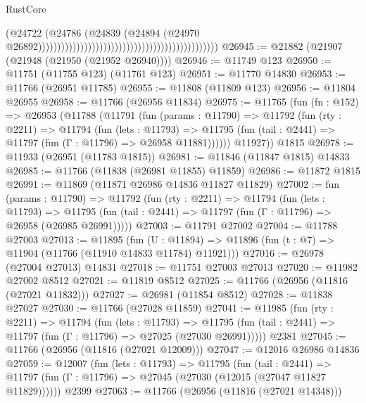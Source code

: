 \begin{lexlean}{RustCore}
\begin{coremodule}
                                                                                        (@24722
                                                                                          (@24786
                                                                                            (@24839
                                                                                              (@24894
                                                                                                (@24970
                                                                                                  @26892)))))))))))))))))))))))))))))))))))))))))))))))
@26945 := @21882 (@21907 (@21948 (@21950 (@21952 @26940))))
@26946 := @11749 @123
@26950 := @11751 (@11755 @123) (@11761 @123)
@26951 := @11770 @14830
@26953 := @11766 (@26951 @11785)
@26955 := @11808 (@11809 @123)
@26956 := @11804 @26955
@26958 := @11766 (@26956 @11834)
@26975 := @11765
    (fun (fn : @152) =>
    @26953
      (@11788
        (@11791
          (fun (params : @11790) =>
          @11792
            (fun (rty : @2211) =>
            @11794
              (fun (lets : @11793) =>
              @11795 (fun (tail : @2441) => @11797 (fun (Γ : @11796) => @26958 @11881))))))
        @11927))
    @1815
@26978 := @11933 (@26951 (@11783 @1815))
@26981 := @11846 (@11847 @1815) @14833
@26985 := @11766 (@11838 (@26981 @11855) @11859)
@26986 := @11872 @1815
@26991 := @11869 (@11871 @26986 @14836 @11827 @11829)
@27002 := fun (params : @11790) =>
  @11792
    (fun (rty : @2211) =>
    @11794
      (fun (lets : @11793) =>
      @11795 (fun (tail : @2441) => @11797 (fun (Γ : @11796) => @26958 (@26985 @26991)))))
@27003 := @11791 @27002
@27004 := @11788 @27003
@27013 := @11895
    (fun (U : @11894) => @11896 (fun (t : @7) => @11904 (@11766 (@11910 @14833 @11784) @11921)))
@27016 := @26978 (@27004 @27013) @14831
@27018 := @11751 @27003 @27013
@27020 := @11982 @27002 @8512
@27021 := @11819 @8512
@27025 := @11766 (@26956 (@11816 (@27021 @11832)))
@27027 := @26981 (@11854 @8512)
@27028 := @11838 @27027
@27030 := @11766 (@27028 @11859)
@27041 := @11985
    (fun (rty : @2211) =>
    @11794
      (fun (lets : @11793) =>
      @11795 (fun (tail : @2441) => @11797 (fun (Γ : @11796) => @27025 (@27030 @26991)))))
    @2381
@27045 := @11766 (@26956 (@11816 (@27021 @12009)))
@27047 := @12016 @26986 @14836
@27059 := @12007
    (fun (lets : @11793) =>
    @11795
      (fun (tail : @2441) =>
      @11797 (fun (Γ : @11796) => @27045 (@27030 (@12015 (@27047 @11827 @11829))))))
    @2399
@27063 := @11766 (@26956 (@11816 (@27021 @14348)))

\end{coremodule}
\end{lexlean}
